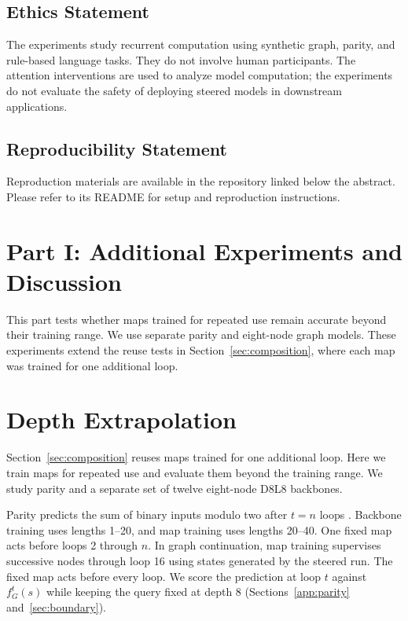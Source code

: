 \documentclass{article}
\begin{document}
\subsection*{Ethics Statement}
The experiments study recurrent computation using synthetic graph, parity, and rule-based language tasks. They do not involve human participants. The attention interventions are used to analyze model computation; the experiments do not evaluate the safety of deploying steered models in downstream applications.

\subsection*{Reproducibility Statement}
Reproduction materials are available in the repository linked below the abstract. Please refer to its README for setup and reproduction instructions.




\appendix

\clearpage
\section*{Part I: Additional Experiments and Discussion}
This part tests whether maps trained for repeated use remain accurate beyond their training range. We use separate parity and eight-node graph models. These experiments extend the reuse tests in Section~\ref{sec:composition}, where each map was trained for one additional loop.

\section{Depth Extrapolation}
\label{app:depth-extrapolation}\label{sec:depth-boundary}
Section~\ref{sec:composition} reuses maps trained for one additional loop. Here we train maps for repeated use and evaluate them beyond the training range. We study parity and a separate set of twelve eight-node D8L8 backbones.

Parity predicts the sum of binary inputs modulo two after $t=n$ loops \citep{fan2025looped}. Backbone training uses lengths 1--20, and map training uses lengths 20--40. One fixed map acts before loops 2 through $n$. In graph continuation, map training supervises successive nodes through loop 16 using states generated by the steered run. The fixed map acts before every loop. We score the prediction at loop $t$ against $f_G^t(s)$ while keeping the query fixed at depth 8 (Sections~\ref{app:parity} and~\ref{sec:boundary}).
\end{document}
